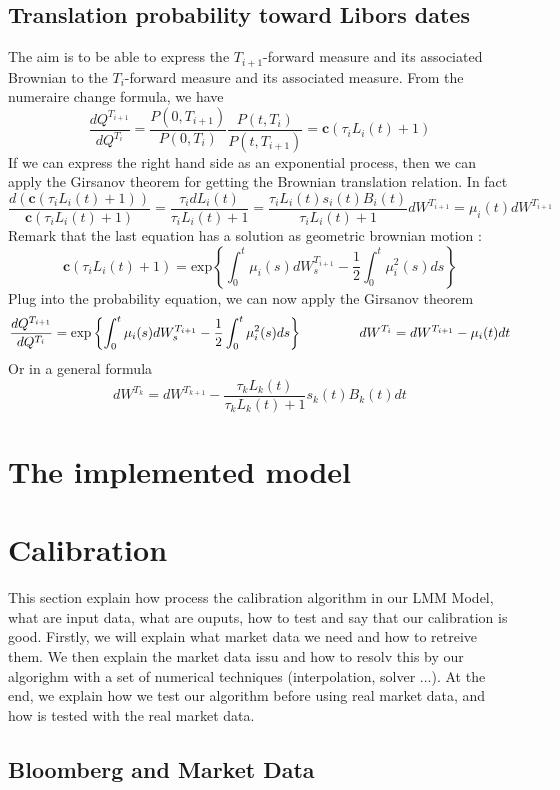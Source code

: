 \documentclass[a4paper,10pt]{article}
\newcommand{\Ti}{T_{i}}
\newcommand{\Tii}{T_{i+1}}
\newcommand{\Pti}{P(t,T_{i})}
\newcommand{\Ptii}{P(t,T_{i+1})}
\newcommand{\Lit}{L_{i}(t)}
\begin{document}
\subsection{Translation probability toward Libors dates}
The aim is to be able to express the $\Tii$-forward measure and its associated Brownian to the $\Ti$-forward measure and its associated measure. From the numeraire change formula, we have
\[
\frac{dQ^{\Tii}}{dQ^{\Ti}} = \frac{P(0,\Tii)}{P(0,\Ti)}\frac{\Pti}{\Ptii} = \textbf{c} (\tau_i \Lit + 1 )
\]
If we can express the right hand side as an exponential process, then we can apply the Girsanov theorem for getting the Brownian translation relation. In fact
\[
\frac{d (\textbf{c} (\tau_i \Lit + 1 )) }{\textbf{c} (\tau_i \Lit + 1 )} 
= \frac{\tau_i d\Lit }{\tau_i \Lit +1} = \frac{\tau_i \Lit s_i(t) B_i(t) }{\tau_i \Lit +1} dW^{\Tii} = \mu_i(t)dW^{\Tii}
\]
Remark that the last equation has a solution as geometric brownian motion :
\[
\textbf{c} (\tau_i \Lit + 1 ) = \text{exp} \left\{ \int_0^t \mu_i(s)dW^{\Tii}_s - \frac{1}{2}\int_0^t \mu^2_i(s)ds \right\}
\]
Plug into the probability equation, we can now apply the Girsanov theorem
\[
\frac{dQ^{\Tii}}{dQ^{\Ti}} = \text{exp} \left\{ \int_0^t \mu_i(s)dW^{\Tii}_s - \frac{1}{2}\int_0^t \mu^2_i(s)ds \right\}
\hspace{1.5cm}
dW^{\Ti} = dW^{\Tii} - \mu_i(t)dt
\]
Or in a general formula
\[
dW^{T_{k}} = dW^{T_{k+1}} - \frac{\tau_k L_k(t)}{\tau_k L_k(t) +1}  s_k(t) B_k(t) dt
\]

\section{The implemented model}
\section{Calibration}
This section explain how process the calibration algorithm in our LMM Model, what are input data, what are ouputs, how to test and say that our calibration is good. Firstly, we will explain what market data we need and how to retreive them. We then explain the market data issu and how to resolv this by our algorighm with a set of numerical techniques (interpolation, solver ...). At the end, we explain how we test our algorithm before using real market data, and how is tested with the real market data.   
\subsection{Bloomberg and Market Data}
\end{document}
